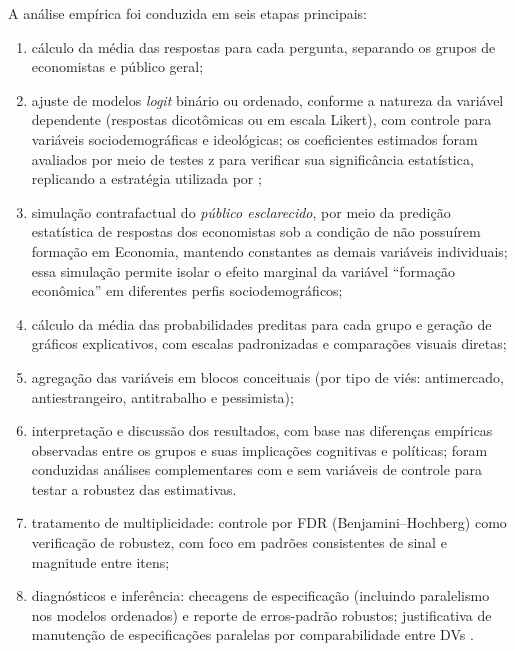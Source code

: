 A análise empírica foi conduzida em seis etapas principais:

\begin{enumerate}[label=\alph*)]
    \item cálculo da média das respostas para cada pergunta, separando os grupos de economistas e público geral;
    
    \item ajuste de modelos \textit{logit} binário ou ordenado, conforme a natureza da variável dependente (respostas dicotômicas ou em escala Likert), com controle para variáveis sociodemográficas e ideológicas; os coeficientes estimados foram avaliados por meio de testes z para verificar sua significância estatística, replicando a estratégia utilizada por ;
    
    \item simulação contrafactual do \textit{público esclarecido}, por meio da predição estatística de respostas dos economistas sob a condição de não possuírem formação em Economia, mantendo constantes as demais variáveis individuais; essa simulação permite isolar o efeito marginal da variável ``formação econômica'' em diferentes perfis sociodemográficos;
    
    \item cálculo da média das probabilidades preditas para cada grupo e geração de gráficos explicativos, com escalas padronizadas e comparações visuais diretas;
    
    \item agregação das variáveis em blocos conceituais (por tipo de viés: antimercado, antiestrangeiro, antitrabalho e pessimista);
    
    \item interpretação e discussão dos resultados, com base nas diferenças empíricas observadas entre os grupos e suas implicações cognitivas e políticas; foram conduzidas análises complementares com e sem variáveis de controle para testar a robustez das estimativas.

    \item tratamento de multiplicidade: controle por FDR (Benjamini–Hochberg) como verificação de robustez, com foco em padrões consistentes de sinal e magnitude entre itens;
    
    \item diagnósticos e inferência: checagens de especificação (incluindo paralelismo nos modelos ordenados) e reporte de erros-padrão robustos; justificativa de manutenção de especificações paralelas por comparabilidade entre DVs \cite{stigum2003}.

\end{enumerate}

